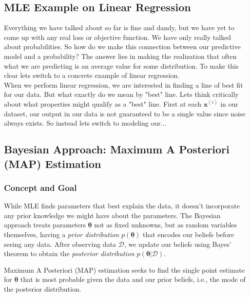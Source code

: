 \documentclass{article}
\begin{document}
\subsection{MLE Example on Linear Regression}
Everything we have talked about so far is fine and dandy, but we have yet to come up with any real loss or objective function. We have only really talked about probabilities. So how do we make this connection between our predictive model and a probability? The answer lies in making the realization that often what we are predicting is an average value for some distribution. To make this clear lets switch to a concrete example of linear regression.\\
When we perform linear regression, we are interested in finding a line of best fit for our data. But what exactly do we mean by "best" line. Lets think critically about what properties might qualify as a "best" line. First at each $\mathbf{x}^{(i)}$ in our dataset, our output in our data is not guaranteed to be a single value since noise always exists. So instead lets switch to modeling our...

\subsection{Bayesian Approach: Maximum A Posteriori (MAP) Estimation}

\subsubsection{Concept and Goal}
While MLE finds parameters that best explain the data, it doesn't incorporate any prior knowledge we might have about the parameters. The Bayesian approach treats parameters $\bm{\theta}$ not as fixed unknowns, but as random variables themselves, having a \emph{prior distribution} $p(\bm{\theta})$ that encodes our beliefs before seeing any data. After observing data $\mathcal{D}$, we update our beliefs using Bayes' theorem to obtain the \emph{posterior distribution} $p(\bm{\theta} | \mathcal{D})$.

Maximum A Posteriori (MAP) estimation seeks to find the single point estimate for $\bm{\theta}$ that is most probable given the data and our prior beliefs, i.e., the mode of the posterior distribution.
\end{document}

